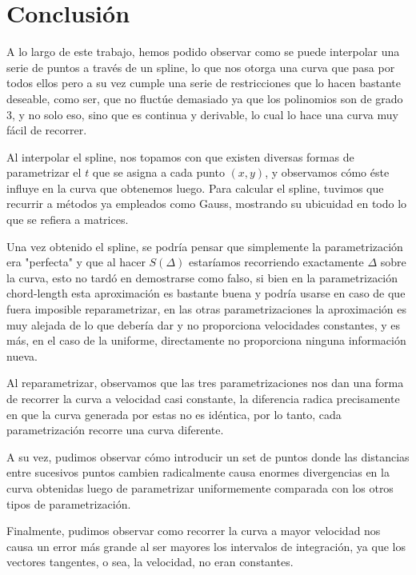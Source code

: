\section{Conclusión}

A lo largo de este trabajo, hemos podido observar como se puede interpolar una serie de puntos a través de un spline, lo que nos otorga una curva que pasa por todos ellos pero a su vez cumple una serie de restricciones que lo hacen bastante deseable, como ser, que no fluctúe demasiado ya que los polinomios son de grado 3, y no solo eso, sino que es continua y derivable, lo cual lo hace una curva muy fácil de recorrer.

Al interpolar el spline, nos topamos con que existen diversas formas de parametrizar el $t$ que se asigna a cada punto $(x,y)$, y observamos cómo éste influye en la curva que obtenemos luego. Para calcular el spline, tuvimos que recurrir a métodos ya empleados como Gauss, mostrando su ubicuidad en todo lo que se refiera a matrices. 

Una vez obtenido el spline, se podría pensar que simplemente la parametrización era "perfecta" y que al hacer $S(\Delta)$ estaríamos recorriendo exactamente $\Delta$ sobre la curva, esto no tardó en demostrarse como falso, si bien en la parametrización chord-length esta aproximación es bastante buena y podría usarse en caso de que fuera imposible reparametrizar, en las otras parametrizaciones la aproximación es muy alejada de lo que debería dar y no proporciona velocidades constantes, y es más, en el caso de la uniforme, directamente no proporciona ninguna información nueva.

Al reparametrizar, observamos que las tres parametrizaciones nos dan una forma de recorrer la curva a velocidad casi constante, la diferencia radica precisamente en que la curva generada por estas no es idéntica, por lo tanto, cada parametrización recorre una curva diferente.

A su vez, pudimos observar cómo introducir un set de puntos donde las distancias entre sucesivos puntos cambien radicalmente causa enormes divergencias en la curva obtenidas luego de parametrizar uniformemente comparada con los otros tipos de parametrización.

Finalmente, pudimos observar como recorrer la curva a mayor velocidad nos causa un error más grande al ser mayores los intervalos de integración, ya que los vectores tangentes, o sea, la velocidad, no eran constantes.


